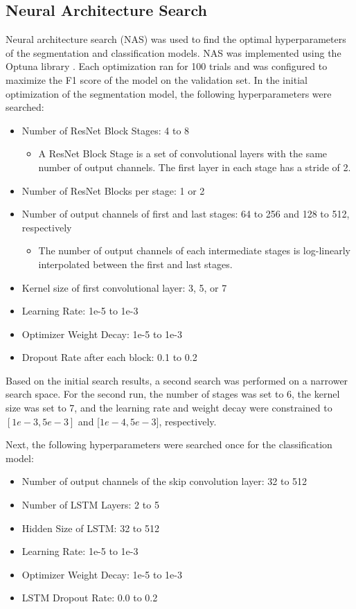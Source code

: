 \documentclass[conference]{IEEEtran}
\begin{document}
\subsection{Neural Architecture Search}
Neural architecture search (NAS) was used to find the optimal hyperparameters of the segmentation and classification models. NAS was implemented using the Optuna library \cite{akiba_2019}. Each optimization ran for 100 trials and was configured to maximize the F1 score of the model on the validation set. In the initial optimization of the segmentation model, the following hyperparameters were searched:
\begin{itemize}
    \item Number of ResNet Block Stages: 4 to 8
        \begin{itemize}
            \item A ResNet Block Stage is a set of convolutional layers with the same number of output channels. The first layer in each stage has a stride of 2.
        \end{itemize}
    \item Number of ResNet Blocks per stage: 1 or 2
    \item Number of output channels of first and last stages: 64 to 256 and 128 to 512, respectively
        \begin{itemize}
            \item The number of output channels of each intermediate stages is log-linearly interpolated between the first and last stages.
        \end{itemize}
    \item Kernel size of first convolutional layer: 3, 5, or 7
    \item Learning Rate: 1e-5 to 1e-3
    \item Optimizer Weight Decay: 1e-5 to 1e-3
    \item Dropout Rate after each block: 0.1 to 0.2
\end{itemize}

Based on the initial search results, a second search was performed on a narrower search space. For the second run, the number of stages was set to 6, the kernel size was set to 7, and the learning rate and weight decay were constrained to $[1e-3,5e-3]$ and [$1e-4,5e-3]$, respectively.

Next, the following hyperparameters were searched once for the classification model:
\begin{itemize}
    \item Number of output channels of the skip convolution layer: 32 to 512
    \item Number of LSTM Layers: 2 to 5
    \item Hidden Size of LSTM: 32 to 512
    \item Learning Rate: 1e-5 to 1e-3
    \item Optimizer Weight Decay: 1e-5 to 1e-3
    \item LSTM Dropout Rate: 0.0 to 0.2
\end{itemize}
\end{document}

